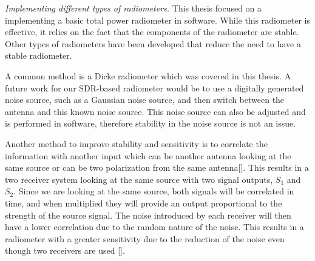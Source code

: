 \emph{Implementing different types of radiometers.}  
This thesis focused on a implementing a basic total power radiometer in software.  While this radiometer is effective, it relies on the fact that the components of the radiometer are stable.  Other types of radiometers have been developed that reduce the need to have a stable radiometer.  



A common method is a Dicke radiometer which was covered in this thesis.  A future work for our SDR-based radiometer would be to use a digitally generated noise source, such as a Gaussian noise source, and then switch between the antenna and this known noise source.  This noise source can also be adjusted and is performed in software, therefore stability in the noise source is not an issue.  


 
Another method to improve stability and sensitivity is to correlate the information with another input which can be another antenna looking at the same source or can be two polarization from the same antenna[\cite{Clapp}].  This results in a two receiver system looking at the same source with two signal outputs, $S_1$ and $S_2$.  Since we are looking at the same source, both signals will be correlated in time, and when multiplied they will provide an output proportional to the strength of the source signal.  The noise introduced by each receiver will then have a lower correlation due to the random nature of the noise.  This results in a radiometer with a greater sensitivity due to the reduction of the noise even though two receivers are used [\cite{Fujimoto}].

